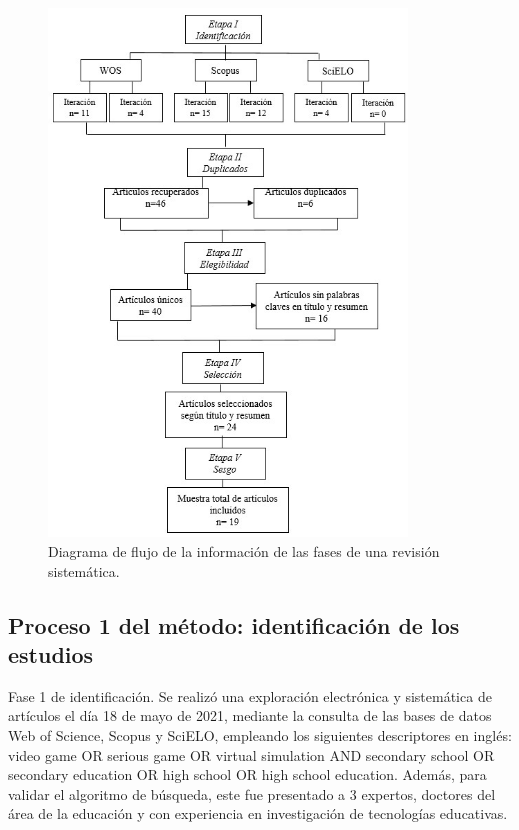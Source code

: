 \documentclass[spanish]{textolivre}
\begin{document}
\begin{figure}[htbp]
 \centering
 \includegraphics[width=0.85\textwidth]{Fig1.jpg}
 \caption{Diagrama de flujo de la información de las fases de una revisión sistemática.}
 \label{fig01}
\end{figure}

\subsection{Proceso 1 del método: identificación de los estudios}\label{sec-conduta}
Fase 1 de identificación. 
Se realizó una exploración electrónica y sistemática de artículos el día 18 de mayo de 2021, mediante la consulta de las bases de datos Web of Science, Scopus y SciELO, empleando los siguientes descriptores en inglés: video game OR serious game OR virtual simulation AND secondary school OR secondary education OR high school OR high school education. Además, para validar el algoritmo de búsqueda, este fue presentado a 3 expertos, doctores del área de la educación y con experiencia en investigación de tecnologías educativas. 
\end{document}
